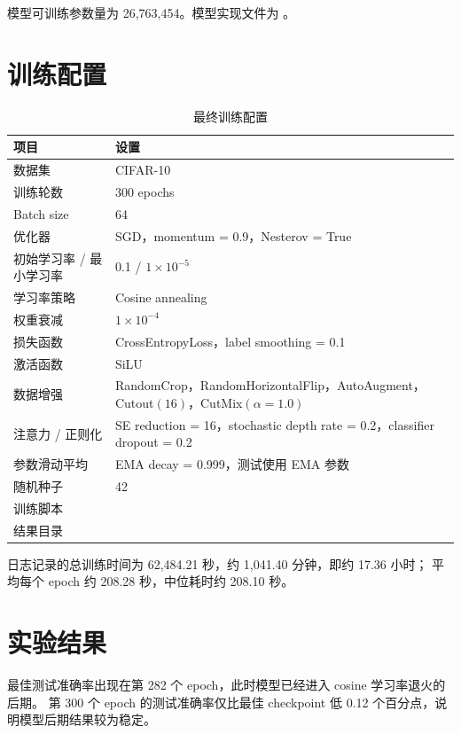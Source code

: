 \documentclass[UTF8]{ctexart}
\begin{document}
模型可训练参数量为 26,763,454。模型实现文件为 。

\section{训练配置}

\begin{table}[H]
    \centering
    \caption{最终训练配置}
    \begin{tabularx}{\textwidth}{lY}
        \toprule
        项目 & 设置 \\
        \midrule
        数据集 & CIFAR-10 \\
        训练轮数 & 300 epochs \\
        Batch size & 64 \\
        优化器 & SGD，momentum = 0.9，Nesterov = True \\
        初始学习率 / 最小学习率 & 0.1 / $1\times10^{-5}$ \\
        学习率策略 & Cosine annealing \\
        权重衰减 & $1\times10^{-4}$ \\
        损失函数 & CrossEntropyLoss，label smoothing = 0.1 \\
        激活函数 & SiLU \\
        数据增强 & RandomCrop，RandomHorizontalFlip，AutoAugment，Cutout$(16)$，CutMix$(\alpha=1.0)$ \\
        注意力 / 正则化 & SE reduction = 16，stochastic depth rate = 0.2，classifier dropout = 0.2 \\
        参数滑动平均 & EMA decay = 0.999，测试使用 EMA 参数 \\
        随机种子 & 42 \\
        训练脚本 &  \\
        结果目录 &  \\
        \bottomrule
    \end{tabularx}
\end{table}

日志记录的总训练时间为 62,484.21 秒，约 1,041.40 分钟，即约 17.36 小时；
平均每个 epoch 约 208.28 秒，中位耗时约 208.10 秒。

\section{实验结果}

最佳测试准确率出现在第 282 个 epoch，此时模型已经进入 cosine 学习率退火的后期。
第 300 个 epoch 的测试准确率仅比最佳 checkpoint 低 0.12 个百分点，说明模型后期结果较为稳定。
\end{document}
